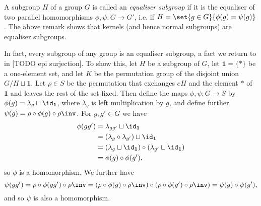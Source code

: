 \documentclass[article, a4paper, 11pt, oneside]{memoir}
\numberwithin{equation}{chapter}
\theoremstyle{nonumberplain}
\renewcommand{\coprod}{\sqcup}
\begin{document}
\begin{remarkbreak}
    \label{rem:equaliser-subgroups}
    A subgroup $H$ of a group $G$ is called an \emph{equaliser subgroup} if it is the equaliser of two parallel homomorphisms $\phi,\psi \colon G \to G'$, i.e. if $H = \set{g \in G}{\phi(g) = \psi(g)}$. The above remark shows that kernels (and hence normal subgroups) are equaliser subgroups.

    In fact, every subgroup of any group is an equaliser subgroup, a fact we return to in [TODO epi surjection]. To show this, let $H$ be a subgroup of $G$, let $\mathbf{1} = \{*\}$ be a one-element set, and let $K$ be the permutation group of the disjoint union $G/H \coprod \mathbf{1}$. Let $\rho \in S$ be the permutation that exchanges $eH$ and the element $*$ of $\mathbf{1}$ and leaves the rest of the set fixed. Then define the maps $\phi, \psi \colon G \to S$ by $\phi(g) = \lambda_g \coprod \id_{\mathbf{1}}$, where $\lambda_g$ is left multiplication by $g$, and define further $\psi(g) = \rho \circ \phi(g) \circ \rho\inv$. For $g,g' \in G$ we have
    \begin{align*}
        \phi(gg')
            &= \lambda_{gg'} \coprod \id_{\mathbf{1}} \\
            &= (\lambda_g \circ \lambda_{g'}) \coprod \id_{\mathbf{1}} \\
            &= (\lambda_g \coprod \id_{\mathbf{1}}) \circ (\lambda_{g'} \coprod \id_{\mathbf{1}}) \\
            &= \phi(g) \circ \phi(g'),
    \end{align*}
    so $\phi$ is a homomorphism. We further have
    \begin{equation*}
        \psi(gg')
            = \rho \circ \phi(gg') \circ \rho\inv
            = (\rho \circ \phi(g) \circ \rho\inv) \circ (\rho \circ \phi(g') \circ \rho\inv)
            = \psi(g) \circ \psi(g'),
    \end{equation*}
    and so $\psi$ is also a homomorphism.


\end{remarkbreak}
\end{document}
